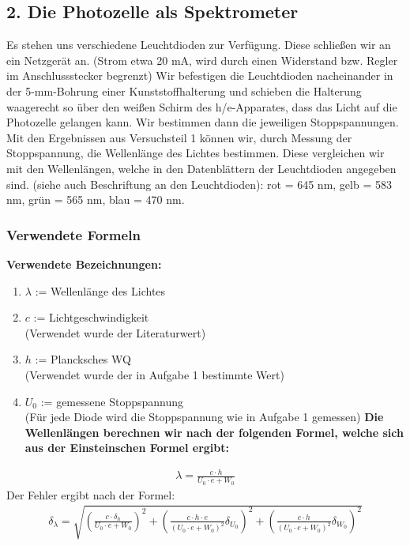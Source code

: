 \documentclass[12px]{scrartcl}
\begin{document}
\subsection{2. Die Photozelle als Spektrometer}
Es stehen uns verschiedene Leuchtdioden zur Verfügung. Diese schließen wir an ein Netzgerät an.
(Strom etwa 20 mA, wird durch einen Widerstand bzw. Regler im Anschlussstecker begrenzt)
Wir befestigen die Leuchtdioden nacheinander in der 5-mm-Bohrung einer Kunststoffhalterung und schieben die Halterung waagerecht so über den weißen Schirm des h/e-Apparates, dass das Licht auf die Photozelle gelangen kann. Wir bestimmen dann die jeweiligen Stoppspannungen.
Mit den Ergebnissen aus Versuchsteil 1 können wir, durch Messung der Stoppspannung, die Wellenlänge des Lichtes bestimmen. Diese vergleichen wir mit den Wellenlängen, welche in den Datenblättern der Leuchtdioden angegeben sind. (siehe auch Beschriftung an den Leuchtdioden):
rot = 645 nm, gelb = 583 nm, grün = 565 nm, blau = 470 nm.
\subsubsection{Verwendete Formeln}
\textbf{Verwendete Bezeichnungen:}
\begin{enumerate}
\item $\lambda$ := Wellenlänge des Lichtes
\item $c$ := Lichtgeschwindigkeit\\
(Verwendet wurde der Literaturwert)
\item $h$ := Plancksches WQ\\
(Verwendet wurde der in Aufgabe 1 bestimmte Wert)
\item $U_0$ := gemessene Stoppspannung\\
(Für jede Diode wird die Stoppspannung wie in Aufgabe 1 gemessen)
\textbf{Die Wellenlängen berechnen wir nach der folgenden Formel, welche sich aus der Einsteinschen Formel ergibt:}
\end{enumerate}
\begin{align}
\lambda = \frac{c \cdot h}{U_0\cdot e + W_0}
\end{align}
Der Fehler ergibt nach der Formel:
\begin{align}
\delta_{\lambda} = \sqrt{
\left(\frac{c \cdot\delta_h}{U_0\cdot e + W_0}\right)^2+
\left(\frac{c \cdot h \cdot e}{(U_0\cdot e + W_0)^2}\delta_{U_0}\right)^2+
\left(\frac{c \cdot h}{(U_0\cdot e + W_0)^2}\delta_{W_0}\right)^2}
\end{align}
\end{document}
